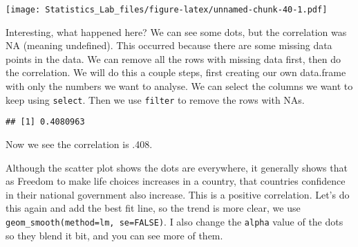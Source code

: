 \documentclass[
]{book}
\newenvironment{Shaded}{\begin{snugshade}}{\end{snugshade}}
\newcommand{\AttributeTok}[1]{\textcolor[rgb]{0.13,0.29,0.53}{#1}}
\newcommand{\FunctionTok}[1]{\textcolor[rgb]{0.13,0.29,0.53}{\textbf{#1}}}
\newcommand{\NormalTok}[1]{#1}
\newcommand{\OtherTok}[1]{\textcolor[rgb]{0.56,0.35,0.01}{#1}}
\newcommand{\SpecialCharTok}[1]{\textcolor[rgb]{0.81,0.36,0.00}{\textbf{#1}}}
\newcommand{\StringTok}[1]{\textcolor[rgb]{0.31,0.60,0.02}{#1}}
\begin{document}
\texttt{[image: Statistics\_Lab\_files/figure-latex/unnamed-chunk-40-1.pdf]}

Interesting, what happened here? We can see some dots, but the correlation was NA (meaning undefined). This occurred because there are some missing data points in the data. We can remove all the rows with missing data first, then do the correlation. We will do this a couple steps, first creating our own data.frame with only the numbers we want to analyse. We can select the columns we want to keep using \texttt{select}. Then we use \texttt{filter} to remove the rows with NAs.

\begin{Shaded}
\end{Shaded}

\begin{verbatim}
## [1] 0.4080963
\end{verbatim}

Now we see the correlation is .408.

Although the scatter plot shows the dots are everywhere, it generally shows that as Freedom to make life choices increases in a country, that countries confidence in their national government also increase. This is a positive correlation. Let's do this again and add the best fit line, so the trend is more clear, we use \texttt{geom\_smooth(method=lm,\ se=FALSE)}. I also change the \texttt{alpha} value of the dots so they blend it bit, and you can see more of them.
\end{document}
